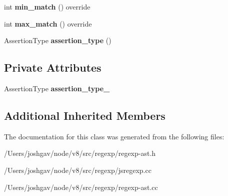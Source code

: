 \begin{DoxyCompactItemize}
\item 
int {\bfseries min\+\_\+match} () override\hypertarget{classv8_1_1internal_1_1_reg_exp_assertion_af6541c01d316e53a10095a4a2c88bdec}{}\label{classv8_1_1internal_1_1_reg_exp_assertion_af6541c01d316e53a10095a4a2c88bdec}

\item 
int {\bfseries max\+\_\+match} () override\hypertarget{classv8_1_1internal_1_1_reg_exp_assertion_a67392097713d7e6c4b68cc596877e165}{}\label{classv8_1_1internal_1_1_reg_exp_assertion_a67392097713d7e6c4b68cc596877e165}

\item 
Assertion\+Type {\bfseries assertion\+\_\+type} ()\hypertarget{classv8_1_1internal_1_1_reg_exp_assertion_a2cd52eb460d7c3108f58e6584cf683ad}{}\label{classv8_1_1internal_1_1_reg_exp_assertion_a2cd52eb460d7c3108f58e6584cf683ad}

\end{DoxyCompactItemize}
\subsection*{Private Attributes}
\begin{DoxyCompactItemize}
\item 
Assertion\+Type {\bfseries assertion\+\_\+type\+\_\+}\hypertarget{classv8_1_1internal_1_1_reg_exp_assertion_a844466a91003d63f38399e5f21ebd28c}{}\label{classv8_1_1internal_1_1_reg_exp_assertion_a844466a91003d63f38399e5f21ebd28c}

\end{DoxyCompactItemize}
\subsection*{Additional Inherited Members}


The documentation for this class was generated from the following files\+:\begin{DoxyCompactItemize}
\item 
/\+Users/joshgav/node/v8/src/regexp/regexp-\/ast.\+h\item 
/\+Users/joshgav/node/v8/src/regexp/jsregexp.\+cc\item 
/\+Users/joshgav/node/v8/src/regexp/regexp-\/ast.\+cc\end{DoxyCompactItemize}
